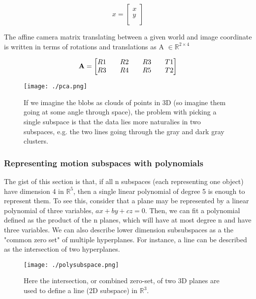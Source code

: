 \documentclass[a4paper]{article}
\begin{document}
\begin{equation}
x =
\begin{bmatrix}
    x \\
    y \\
\end{bmatrix}
\end{equation}



The affine camera matrix translating between a given world and image coordinate
is written in terms of rotations and translations as A $\in \mathbb{R}^{2 \times 4}$

\begin{equation}
{\bf A} = 
\begin{bmatrix}
    R1 && R2 && R3 && T1 \\
    R3 && R4 && R5 && T2 \\ 
\end{bmatrix}
\end{equation}

 \begin{figure}
     \centering
     \texttt{[image: ./pca.png]}
     \caption{If we imagine the blobs as clouds of points in 3D
     (so imagine them going at some angle through space), the  problem with picking a single subspace
     is that the data lies more naturalies in two subspaces, e.g. the two lines
     going through the gray and dark gray clusters.}
 \end{figure}

\subsubsection{Representing motion subspaces with polynomials}

 The gist of this section is that, if all n subspaces (each representing one
 object) have dimension 4 in $\mathbb{R}^5$, then a single linear polynomial of
 degree 5 is enough to represent them. To see this, consider that a plane may be
 represented by a linear polynomial of three variables, $ax+by+cz = 0$. Then, we
 can fit a polynomial defined as the product of the n planes, which will have at
 most degree n and have three variables. We can also describe lower dimension
 subsubspaces as a the "common zero set" of multiple hyperplanes. For instance,
 a line can be described as the intersection of two hyperplanes. 


 \begin{figure}
     \centering
     \texttt{[image: ./polysubspace.png]}
     \caption{Here the intersection, or combined zero-set, of two 3D planes are
     used to define a line (2D subspace) in $\mathbb{R}^3$.}
 \end{figure}
\end{document}
